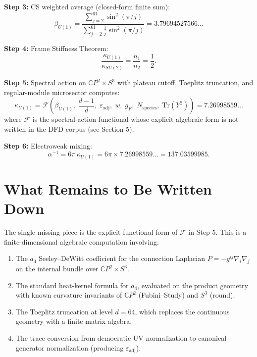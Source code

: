\documentclass[11pt,a4paper]{article}
\theoremstyle{definition}
\begin{document}
\noindent\textbf{Step 3:} CS weighted average (closed-form finite sum):
\begin{equation}
\beta_{U(1)} = \frac{\sum_{j=2}^{61}\sin^2(\pi/j)}
               {\sum_{j=2}^{61}\frac{1}{j}\sin^2(\pi/j)}
= 3.79694527566\ldots
\end{equation}

\noindent\textbf{Step 4:} Frame Stiffness Theorem:
\begin{equation}
\frac{\kappa_{U(1)}}{\kappa_{SU(2)}} = \frac{n_1}{n_2} = \frac{1}{2}.
\end{equation}

\noindent\textbf{Step 5:} Spectral action on $\mathbb{C}P^2 \times S^3$ with
plateau cutoff, Toeplitz truncation, and regular-module microsector computes:
\begin{equation}
\kappa_{U(1)} = \mathcal{F}\!\left(\beta_{U(1)},\; \frac{d{-}1}{d},\;
\varepsilon_{\mathrm{adj}},\; w,\; g_F,\; N_{\mathrm{species}},\;
\mathrm{Tr}(Y^2)\right) = 7.26998559\ldots
\end{equation}
where $\mathcal{F}$ is the spectral-action functional whose explicit algebraic
form is not written in the DFD corpus (see Section 5).

\noindent\textbf{Step 6:} Electroweak mixing:
\begin{equation}
\alpha^{-1} = 6\pi\,\kappa_{U(1)} = 6\pi \times 7.26998559\ldots = 137.03599985.
\end{equation}

\section{What Remains to Be Written Down}

The single missing piece is the explicit functional form of $\mathcal{F}$
in Step 5.  This is a finite-dimensional algebraic computation involving:
\begin{enumerate}
\item The $a_4$ Seeley--DeWitt coefficient for the connection Laplacian
$P = -g^{ij}\nabla_i\nabla_j$ on the internal bundle over
$\mathbb{C}P^2 \times S^3$.
\item The standard heat-kernel formula for $a_4$, evaluated on the product
geometry with known curvature invariants of $\mathbb{C}P^2$ (Fubini--Study)
and $S^3$ (round).
\item The Toeplitz truncation at level $d = 64$, which replaces the continuous
geometry with a finite matrix algebra.
\item The trace conversion from democratic UV normalization to canonical
generator normalization (producing $\varepsilon_{\mathrm{adj}}$).
\end{enumerate}
\end{document}
